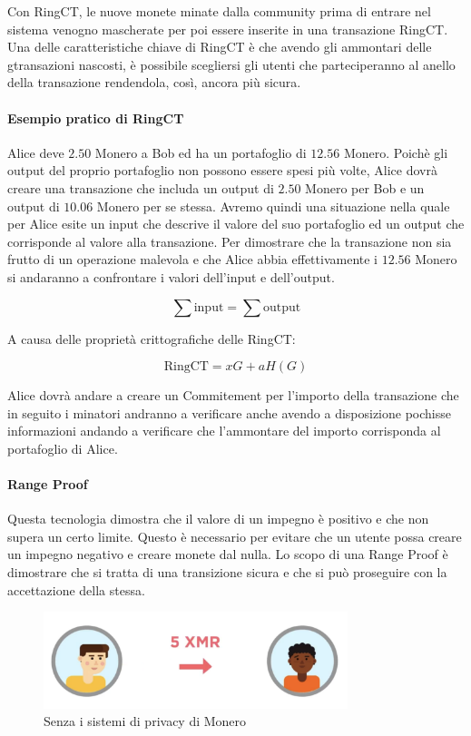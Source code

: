 \documentclass[12pt,a4paper]{article}
\begin{document}
Con RingCT, le nuove monete minate dalla community prima di entrare nel sistema venogno mascherate per poi essere inserite in una transazione RingCT. 
Una delle caratteristiche chiave di RingCT è che avendo gli ammontari delle gtransazioni nascosti, è possibile scegliersi gli utenti che parteciperanno al anello della transazione rendendola, così, ancora più sicura.

\paragraph{Esempio pratico di RingCT}

Alice deve $ 2.50 $ Monero a Bob ed ha un portafoglio di $ 12.56 $ Monero. Poichè gli output del proprio portafoglio non possono essere spesi più volte, Alice dovrà creare una transazione che includa un output di $ 2.50 $ Monero per Bob e un output di $ 10.06 $ Monero per se stessa. Avremo quindi una situazione nella quale per Alice esite un input che descrive il valore del suo portafoglio ed un output che corrisponde al valore alla transazione. Per dimostrare che la transazione non sia frutto di un operazione malevola e che Alice abbia effettivamente i $ 12.56 $ Monero si andaranno a confrontare i valori dell'input e dell'output.

$$ \sum \text{input} = \sum \text{output} $$

A causa delle proprietà crittografiche delle RingCT: 

$$ \text{RingCT} = xG + aH(G) $$ 

Alice dovrà andare a creare un Commitement per l'importo della transazione che in seguito i minatori andranno a verificare anche avendo a disposizione pochisse informazioni andando a verificare che l'ammontare del importo corrisponda al portafoglio di Alice.

\paragraph{Range Proof}

Questa tecnologia dimostra che il valore di un impegno è positivo e che non supera un certo limite. Questo è necessario per evitare che un utente possa creare un impegno negativo e creare monete dal nulla.
Lo scopo di una Range Proof è dimostrare che si tratta di una transizione sicura e che si può proseguire con la accettazione della stessa.

\begin{figure}[ht]
    \centering
    \includegraphics[width=0.79\textwidth]{./images/before.png}
    \caption{Senza i sistemi di privacy di Monero}
    \label{fig:summary}
\end{figure}
\end{document}
